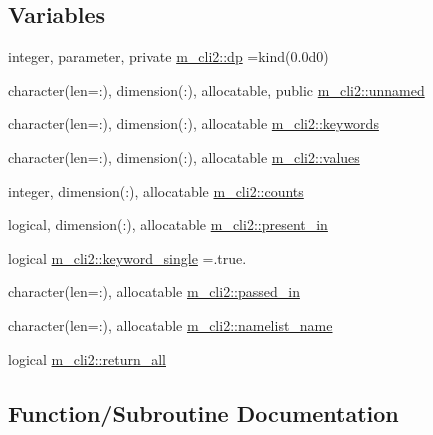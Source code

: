 \subsection*{Variables}
\begin{DoxyCompactItemize}
\item 
integer, parameter, private \mbox{\hyperlink{namespacem__cli2_acf83f1963cf6a56ad0221cfcf5402440}{m\+\_\+cli2\+::dp}} =kind(0.\+0d0)
\item 
character(len=\+:), dimension(\+:), allocatable, public \mbox{\hyperlink{namespacem__cli2_a5b03781cb432174f4ee8d734ecbb9604}{m\+\_\+cli2\+::unnamed}}
\item 
character(len=\+:), dimension(\+:), allocatable \mbox{\hyperlink{namespacem__cli2_a314f3903115db4ab9e2ec03b540aec76}{m\+\_\+cli2\+::keywords}}
\item 
character(len=\+:), dimension(\+:), allocatable \mbox{\hyperlink{namespacem__cli2_af631ee3a1bca98e9fbf1f80646dae360}{m\+\_\+cli2\+::values}}
\item 
integer, dimension(\+:), allocatable \mbox{\hyperlink{namespacem__cli2_abf81746a55c2218c7f2de15602bc0be8}{m\+\_\+cli2\+::counts}}
\item 
logical, dimension(\+:), allocatable \mbox{\hyperlink{namespacem__cli2_adf9ffb8a34d1bd666fa91ed953bcb9f4}{m\+\_\+cli2\+::present\+\_\+in}}
\item 
logical \mbox{\hyperlink{namespacem__cli2_a7f0b96691836126dc7f258a3da75b494}{m\+\_\+cli2\+::keyword\+\_\+single}} =.true.
\item 
character(len=\+:), allocatable \mbox{\hyperlink{namespacem__cli2_a649439045139e5473091df65ecde6a4b}{m\+\_\+cli2\+::passed\+\_\+in}}
\item 
character(len=\+:), allocatable \mbox{\hyperlink{namespacem__cli2_a46b2d1d3b3dbe6fb8b96c7459f3e8046}{m\+\_\+cli2\+::namelist\+\_\+name}}
\item 
logical \mbox{\hyperlink{namespacem__cli2_abbcd01a5c2a1e6030d09f3a5dbe1fa45}{m\+\_\+cli2\+::return\+\_\+all}}
\end{DoxyCompactItemize}


\subsection{Function/\+Subroutine Documentation}
\mbox{\label{M__CLI2_8f90_a8e39955a72727c584de84fedd23a25c4}} 
